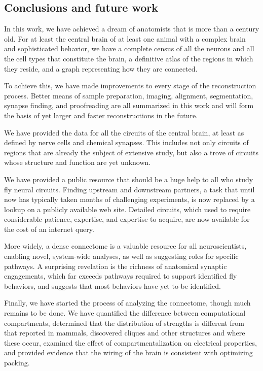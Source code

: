 \documentclass{article}
\begin{document}
\subsection*{Conclusions and future work}

In this work, we have achieved a dream of anatomists that is more than a century old. For at least the central brain of at least one animal with a complex brain and sophisticated behavior, we have a complete census of all the neurons and all the cell types that constitute the brain, a definitive atlas of the regions in which they reside, and a graph representing how they are connected.

To achieve this, we have made improvements to every stage of the reconstruction process. Better means of sample preparation, imaging, alignment, segmentation, synapse finding, and proofreading are all summarized in this work and will form the basis of yet larger and faster reconstructions in the future.

We have provided the data for all the circuits of the central brain, at least as defined by nerve cells and chemical synapses. This includes not only circuits of regions that are already the subject of extensive study, but also a trove of circuits whose structure and function are yet unknown.

We have provided a public resource that should be a huge help to all who study fly neural circuits. Finding upstream and downstream partners, a task that until now has typically taken months of challenging experiments, is now replaced by a lookup on a publicly available web site. Detailed circuits, which used to require considerable patience, expertise, and expertise to acquire, are now available for the cost of an internet query.

More widely, a dense connectome is a valuable resource for all neuroscientists, enabling novel, system-wide analyses, as well as suggesting roles for specific pathways. A surprising revelation is the richness of anatomical synaptic engagements, which far exceeds pathways required to support identified fly behaviors, and suggests that most behaviors have yet to be identified.

Finally, we have started the process of analyzing the connectome, though much remains to be done. We have quantified the difference between computational compartments, determined that the distribution of strengths is different from that reported in mammals, discovered cliques and other structures and where these occur, examined the effect of compartmentalization on electrical properties, and provided evidence that the wiring of the brain is consistent with optimizing packing.
\end{document}

